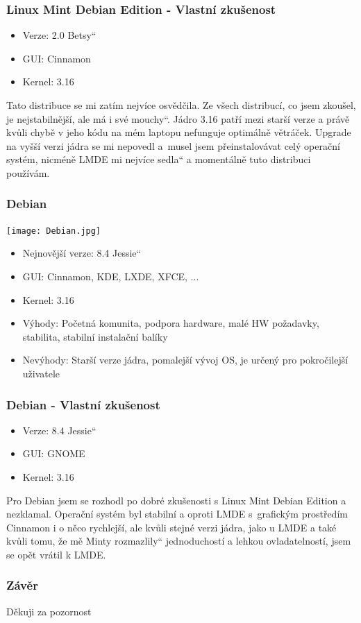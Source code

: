 \documentclass{beamer}
\newcommand{\czuv}[1]{\quotedblbase #1\textquotedblleft}
\begin{document}
  \begin{frame}
    \frametitle{Linux Mint Debian Edition - Vlastní zkušenost}
      \begin{itemize}
	\item Verze: 2.0 \czuv{Betsy}
	\item GUI: Cinnamon
	\item Kernel: 3.16
      \end{itemize}
      Tato distribuce se mi zatím nejvíce osvědčila. Ze všech distribucí, co jsem zkoušel,
      je nejstabilnější, ale má i své \czuv{mouchy}. Jádro 3.16 patří mezi starší verze
      a právě kvůli chybě v jeho kódu na mém laptopu nefunguje optimálně větráček. Upgrade na vyšší verzi
      jádra se mi nepovedl a~musel jsem přeinstalovávat celý operační systém, nicméně LMDE
      mi nejvíce \czuv{sedla} a momentálně tuto distribuci používám.
  \end{frame}
  \begin{frame}
    \frametitle{Debian}
    \texttt{[image: Debian.jpg]}
      \begin{itemize}
	\item Nejnovější verze: 8.4 \czuv{Jessie}
	\item GUI: Cinnamon, KDE, LXDE, XFCE, ...
	\item Kernel: 3.16
	\item Výhody: Početná komunita, podpora hardware, malé HW požadavky, stabilita, stabilní instalační balíky
	\item Nevýhody: Starší verze jádra, pomalejší vývoj OS, je určený pro pokročilejší uživatele
      \end{itemize}
  \end{frame}
  \begin{frame}
    \frametitle{Debian - Vlastní zkušenost}
      \begin{itemize}
	\item Verze: 8.4 \czuv{Jessie}
	\item GUI: GNOME
	\item Kernel: 3.16
      \end{itemize}
      Pro Debian jsem se rozhodl po dobré zkušenosti s Linux Mint Debian Edition a nezklamal.
      Operační systém byl stabilní a oproti LMDE s~grafickým prostředím Cinnamon i o něco rychlejší,
      ale kvůli stejné verzi jádra, jako u LMDE a také kvůli tomu, že mě Minty \czuv{rozmazlily}
      jednoduchostí a lehkou ovladatelností, jsem se opět vrátil k LMDE.
  \end{frame}
  \begin{frame}
    \frametitle{Závěr}
    \begin{center}
      Děkuji za pozornost
    \end{center}
  \end{frame}
\end{document}
